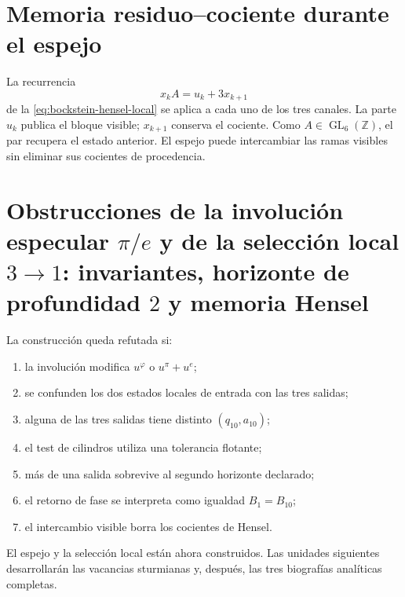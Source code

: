 \section{Memoria residuo--cociente durante el espejo}

La recurrencia
\[
 x_kA=u_k+3x_{k+1}
\]
de la \cref{eq:bockstein-hensel-local} se aplica a cada uno de los tres
canales. La parte \(u_k\) publica el bloque visible; \(x_{k+1}\) conserva
el cociente. Como \(A\in\operatorname{GL}_6(\mathbb Z)\), el par recupera
el estado anterior. El espejo puede intercambiar las ramas visibles sin
eliminar sus cocientes de procedencia.

\section{Obstrucciones de la involución especular \(\pi/e\) y de la selección local \(3\to1\): invariantes, horizonte de profundidad \(2\) y memoria Hensel}

\begin{criterion}
La construcción queda refutada si:
\begin{enumerate}
 \item la involución modifica \(u^\varphi\) o \(u^\pi+u^e\);
 \item se confunden los dos estados locales de entrada con las tres salidas;
 \item alguna de las tres salidas tiene distinto \((q_{10},a_{10})\);
 \item el test de cilindros utiliza una tolerancia flotante;
 \item más de una salida sobrevive al segundo horizonte declarado;
 \item el retorno de fase se interpreta como igualdad \(B_1=B_{10}\);
 \item el intercambio visible borra los cocientes de Hensel.
\end{enumerate}
\end{criterion}

El espejo y la selección local están ahora construidos. Las unidades
siguientes desarrollarán las vacancias sturmianas y, después, las tres
biografías analíticas completas.
